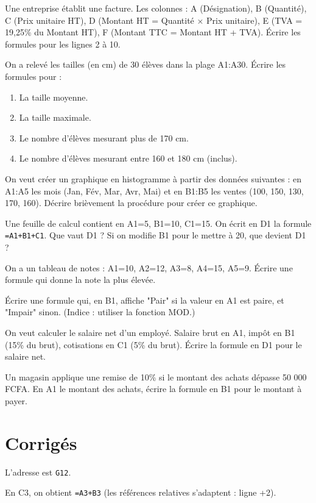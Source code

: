 \sujetbac[Facture]
\exo{}
Une entreprise établit une facture. Les colonnes : A (Désignation), B (Quantité), C (Prix unitaire HT), D (Montant HT = Quantité × Prix unitaire), E (TVA = 19,25\% du Montant HT), F (Montant TTC = Montant HT + TVA). Écrire les formules pour les lignes 2 à 10.

\sujetbac[Statistiques]
\exo{}
On a relevé les tailles (en cm) de 30 élèves dans la plage A1:A30. Écrire les formules pour :
\begin{enumerate}
    \item La taille moyenne.
    \item La taille maximale.
    \item Le nombre d'élèves mesurant plus de 170 cm.
    \item Le nombre d'élèves mesurant entre 160 et 180 cm (inclus).
\end{enumerate}

\exo{}
On veut créer un graphique en histogramme à partir des données suivantes : en A1:A5 les mois (Jan, Fév, Mar, Avr, Mai) et en B1:B5 les ventes (100, 150, 130, 170, 160). Décrire brièvement la procédure pour créer ce graphique.

\exo{}
Une feuille de calcul contient en A1=5, B1=10, C1=15. On écrit en D1 la formule \texttt{=A1+B1+C1}. Que vaut D1 ? Si on modifie B1 pour le mettre à 20, que devient D1 ?

\exo{}
On a un tableau de notes : A1=10, A2=12, A3=8, A4=15, A5=9. Écrire une formule qui donne la note la plus élevée.

\exo{}
Écrire une formule qui, en B1, affiche "Pair" si la valeur en A1 est paire, et "Impair" sinon. (Indice : utiliser la fonction MOD.)

\exo{}
On veut calculer le salaire net d'un employé. Salaire brut en A1, impôt en B1 (15\% du brut), cotisations en C1 (5\% du brut). Écrire la formule en D1 pour le salaire net.

\exo{}
Un magasin applique une remise de 10\% si le montant des achats dépasse 50 000 FCFA. En A1 le montant des achats, écrire la formule en B1 pour le montant à payer.

\section{Corrigés}

L'adresse est \texttt{G12}.

En C3, on obtient \texttt{=A3+B3} (les références relatives s'adaptent : ligne +2).

